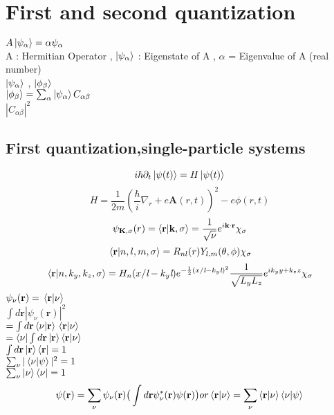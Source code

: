 \documentclass{article}
\begin{document}
\section{First and second quantization}
$ A\ket{\psi_\alpha}=\alpha \psi_\alpha $ \\
A : Hermitian Operator , $\ket{\psi_\alpha}$ : Eigenstate of A , $\alpha$ = Eigenvalue of A (real number) \\
$\ket{\psi_\alpha}$ , $\ket{\phi_\beta}$ \\
$\ket{\phi_{\beta}}=\sum_\alpha \ket{\psi_\alpha}C_{\alpha\beta}$ \\
$|C_{\alpha\beta}|^2$
\subsection{First quantization,single-particle systems}
\begin{equation}
    i\hbar\partial _t \ket{\psi(t)}=H\ket{\psi(t)}
\end{equation}
\begin{equation}
    H=\frac{1}{2m}(\frac{\hbar}{i}\nabla_r + e\textbf{A} (r,t))^2 -e\phi (r,t)
\end{equation}
\begin{equation}
    \psi_{\textbf{K},\sigma}(r)=\braket{\textbf{r}}{\textbf{k},\sigma} = \frac{1}{\sqrt{\nu}}e^{i\textbf{k}\cdot\textbf{r}}\chi_{\sigma}
\end{equation}
\begin{equation}
    \braket*{\textbf{r}}{n,l,m,\sigma}=R_{nl}(r)Y_{l,m}(\theta,\phi)\chi_{\sigma}
\end{equation}
\begin{equation}
    \braket*{\textbf{r}}{n,k_y,k_z,\sigma}=H_n(x/\textit{l}-k_y\textit{l})e^{-\frac{1}{2}(x/\textit{l}-k_y\textit{l})^2}\frac{1}{\sqrt{L_yL_z}}e^{ik_y y+k_z z}\chi_\sigma
\end{equation}
$\psi_\nu (\textbf{r})=\braket*{\textbf{r}}{\nu}$ \\
$\int d\textbf{r} |\psi_\nu (\textbf{r})|^2$\\
$=\int d\textbf{r} \braket*{\nu}{\textbf{r}}\braket*{\textbf{r}}{\nu}$\\
$=\bra{\nu}\int d\textbf{r} \ket{\textbf{r}}\bra{\textbf{r}} \ket{\nu}$\\
$\int d\textbf{r} \ket{\textbf{r}}\bra{\textbf{r}}=1 $\\
$\sum_\nu |\braket*{\nu}{\psi}|^2 =1 $\\
$\sum_\nu \ket{\nu}\bra{\nu} = 1 $\\
\begin{equation*}
    \psi(\textbf{r})=\sum_\nu \psi_\nu(\textbf{r})\big( \int d\textbf{r}\psi^*_\nu (\textbf{r}) \psi(\textbf{r}) \big) \\ or \braket{\textbf{r}}{\nu}=\sum_\nu \braket{\textbf{r}}{\nu} \braket{\nu}{\psi}
\end{equation*}
\end{document}

